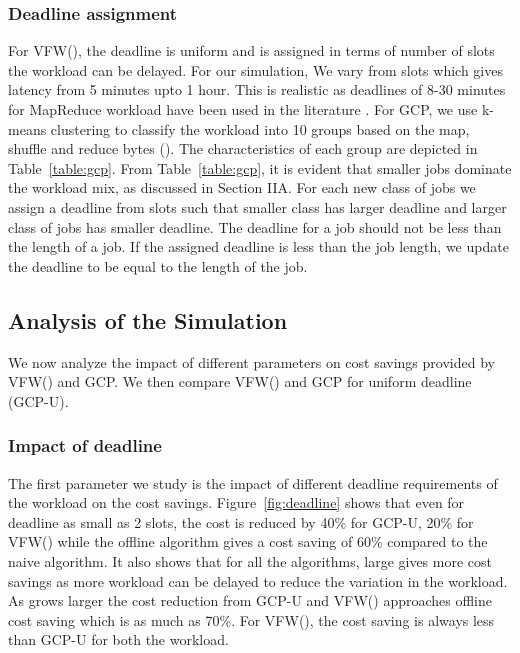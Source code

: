 \documentclass[10pt,conference,compsocconf,letterpaper]{IEEEtran}
\begin{document}
\subsubsection*{Deadline assignment}
For VFW(), the deadline  is uniform and is assigned in terms of number of slots the workload can be delayed. For our simulation, We vary  from  slots which gives latency from 5 minutes upto 1 hour. This is realistic as deadlines of 8-30 minutes for MapReduce workload have been used in the literature \cite{n10,n11}. For GCP, we use k-means clustering to classify the workload into 10 groups based on the map, shuffle and reduce bytes (). The characteristics of each group are depicted in Table~\ref{table:gcp}. From Table~\ref{table:gcp}, it is evident that smaller jobs dominate the workload mix, as discussed in Section IIA. For each new class of jobs we assign a deadline from  slots such that smaller class has larger deadline and larger class of jobs has smaller deadline. The deadline for a job should not be less than the length of a job. If the assigned deadline is less than the job length, we update the deadline to be equal to the length of the job.





































\subsection{Analysis of the Simulation}
We now analyze the impact of different parameters on cost savings provided by VFW() and GCP. We then compare VFW() and GCP for uniform deadline (GCP-U).




\subsubsection*{Impact of deadline}
The first parameter we study is the impact of different deadline requirements of the workload on the cost savings. Figure~\ref{fig:deadline} shows that even for deadline  as small as 2 slots, the cost is reduced by 40\% for GCP-U, 20\% for VFW() while the offline algorithm gives a cost saving of 60\% compared to the naive algorithm. It also shows that for all the algorithms, large  gives more cost savings as more workload can be delayed to reduce the variation in the workload. As  grows larger the cost reduction from GCP-U and VFW() approaches offline cost saving which is as much as 70\%. For VFW(), the cost saving is always less than GCP-U for both the workload.
\end{document}
